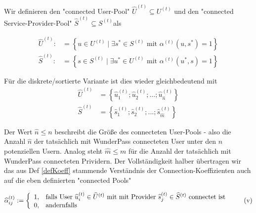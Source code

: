 \begin{Def}\label{defPools}

Wir definieren den "connected User-Pool" $\widehat{U}^{(t)} \subseteq U^{(t)}$ und den "connected Service-Provider-Pool" $\widehat{S}^{(t)} \subseteq S^{(t)}$als

\begin{align}
\widehat{U}^{(t)}:&= \left\{u \in U^{(t)} \mid \exists s^{*} \in S^{(t)} \textrm{ mit } \alpha^{(t)}(u, s^{*}) = 1 \right\} \tag{i} \\ 
\widehat{S}^{(t)}:&= \left\{s \in S^{(t)} \mid \exists u^{*} \in U^{(t)} \textrm{ mit } \alpha^{(t)}(u^{*}, s) = 1 \right\} \tag{ii}
\end{align}

\vspace{0.3cm}

Für die diskrete/sortierte Variante ist dies wieder gleichbedeutend mit
\begin{align}
\widehat{U}^{(t)} &= \left\{ \widehat{u}^{(t)}_1; \widehat{u}^{(t)}_2;...; \widehat{u}^{(t)}_{\widehat{n}} \right\} \tag{iii} \\ 
\widehat{S}^{(t)} &= \left\{ \widehat{s}^{(t)}_1; \widehat{s}^{(t)}_2;...; \widehat{s}^{(t)}_{\widehat{m}}\right\} \tag{iv}
\end{align}

\vspace{0.6cm}

Der Wert $\widehat{n} \leq n$ beschreibt die Größe des connecteten User-Pools - also die Anzahl $\widehat{n}$ der tatsächlich mit WunderPass connecteten User unter den $n$ potenziellen Usern. Analog steht $\widehat{m} \leq m$ für die Anzahl der tatsächlich mit WunderPass connecteten Prividern. Der Vollständigkeit halber übertragen wir das aus Def \ref{defKoeff} stammende Verständnis der Connection-Koeffizienten auch auf die eben definierten "connected Pools"

\[
\widehat{\alpha}^{(t)}_{ij}:=\left\{%
\begin{array}{ll}
    1, & \hbox{falls User $\widehat{u}^{(t)}_i \in \widehat{U}^{(t)}$ mit mit Provider $\widehat{s}^{(t)}_j \in \widehat{S}^{(t)}$ connectet ist} \\
    0, & \hbox{andernfalls} \\
\end{array}%
\right. \tag{v}
\] 

\end{Def}

\vspace{0.6cm}

